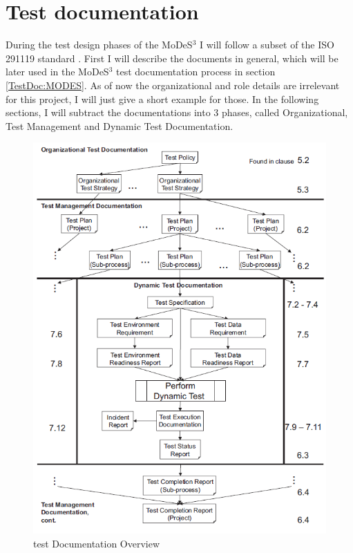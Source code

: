\section{Test documentation}
During the test design phases of the MoDeS$^3$ I will follow a subset of the ISO 291119 standard \cite{IEEE13}.
First I will describe the documents in general, which will be later used in the MoDeS$^3$ test documentation process in section \autoref{TestDoc:MODES}. As of now the organizational and role details are irrelevant for this project, I will just give a short example for those. In the following sections, I will subtract the documentations into 3 phases, called Organizational, Test Management and Dynamic Test Documentation. 
\begin{figure}[!h]
	\centering
	\includegraphics[width=150mm, keepaspectratio]{figures/testDesign/TestDoc.png}
	\caption{test Documentation Overview}
	\label{fig:TestDocOverview}
\end{figure}


